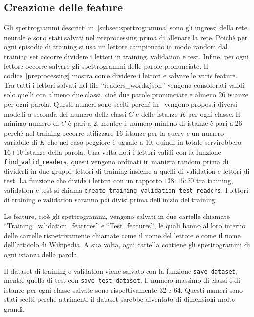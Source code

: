 \documentclass[12pt,a4paper,titlepage]{article}
\begin{document}
\subsection{Creazione delle feature}
\label{subsec:creazione_feature}
Gli spettrogrammi descritti in~\ref{subsec:spettrogramma} sono gli ingressi della rete neurale e sono stati salvati nel preprocessing prima di allenare la rete. Poiché per ogni episodio di training si usa un lettore campionato in modo random dal training set occorre dividere i lettori in training, validation e test. Infine, per ogni lettore occorre salvare gli spettrogrammi delle parole pronunciate. Il codice~\ref{preprocessing} mostra come dividere i lettori e salvare le varie feature. Tra tutti i lettori salvati nel file ``readers\_words.json'' vengono considerati validi solo quelli con almeno due classi, cioè due parole pronunciate e almeno 26 istanze per ogni parola. Questi numeri sono scelti perché in~\cite{Salamon:Few-Shot} vengono proposti diversi modelli a seconda del numero delle classi $C$ e delle istanze $K$ per ogni classe. Il minimo numero di $C$ è pari a 2, mentre il numero minimo di istanze è pari a 26 perché nel training occorre utilizzare 16 istanze per la query e un numero variabile di $K$ che nel caso peggiore è uguale a 10, quindi in totale servirebbero 16+10 istanze della parola. Una volta noti i lettori validi con la funzione \texttt{find\_valid\_readers}, questi vengono ordinati in maniera random prima di dividerli in due gruppi: lettori di training insieme a quelli di validation e lettori di test. La funzione che divide i lettori con un rapporto $138:15:30$ tra training, validation e test si chiama \texttt{create\_training\_validation\_test\_readers}.
I lettori di training e validation saranno poi divisi prima dell'inizio del training.

Le feature, cioè gli spettrogrammi, vengono salvati in due cartelle chiamate ``Training\_validation\_features'' e ``Test\_features'', le quali hanno al loro interno delle cartelle rispettivamente chiamate come il nome del lettore e come il nome dell'articolo di Wikipedia. A sua volta, ogni cartella contiene gli spettrogrammi di ogni istanza della parola.

Il dataset di training e validation viene salvato con la funzione \texttt{save\_dataset}, mentre quello di test con \texttt{save\_test\_dataset}. Il numero massimo di classi e di istanze per ogni classe salvate sono rispettivamente 32 e 64. Questi numeri sono stati scelti perché altrimenti il dataset sarebbe diventato di dimensioni molto grandi.
\end{document}
